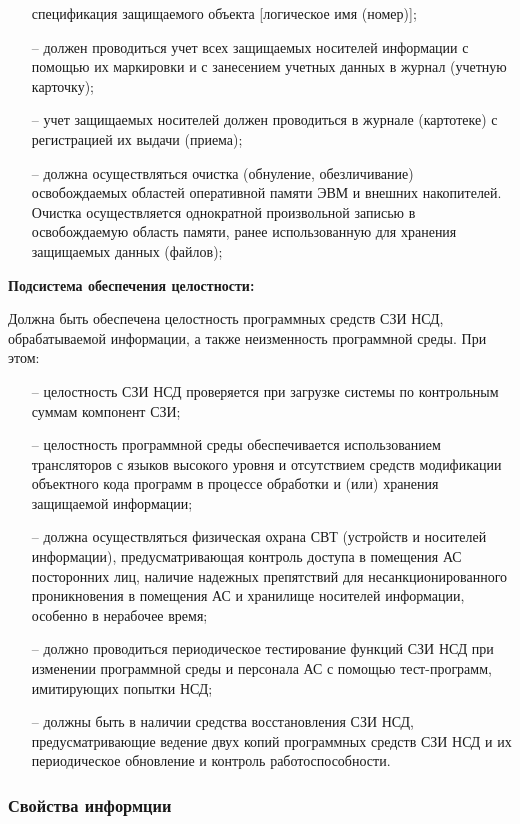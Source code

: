 \begin{itemize}
  спецификация защищаемого объекта [логическое имя (номер)];
  \item[--] должен проводиться учет всех защищаемых носителей информации с помощью их
  маркировки и с занесением учетных данных в журнал (учетную карточку);
  \item[--] учет защищаемых носителей должен проводиться в журнале (картотеке) с регистрацией
   их выдачи (приема);
  \item[--] должна осуществляться очистка (обнуление, обезличивание) освобождаемых 
  областей оперативной памяти ЭВМ и внешних накопителей. Очистка осуществляется однократной 
  произвольной записью в освобождаемую область памяти, ранее использованную для хранения 
  защищаемых данных (файлов);
\end{itemize}

\textbf{Подсистема обеспечения целостности:}

Должна быть обеспечена целостность программных средств СЗИ НСД,
обрабатываемой информации, а также неизменность программной среды. При этом:

\begin{itemize}
  \item[--] целостность СЗИ НСД проверяется при загрузке системы по контрольным
  суммам компонент СЗИ;
  \item[--] целостность программной среды обеспечивается использованием
  трансляторов с языков высокого уровня и отсутствием средств модификации
  объектного кода программ в процессе обработки и (или) хранения
  защищаемой информации;
  \item[--] должна осуществляться физическая охрана СВТ (устройств и носителей
  информации), предусматривающая контроль доступа в помещения АС
  посторонних лиц, наличие надежных препятствий для несанкционированного
  проникновения в помещения АС и хранилище носителей информации,
  особенно в нерабочее время;
  \item[--] должно проводиться периодическое тестирование функций СЗИ НСД при
  изменении программной среды и персонала АС с помощью тест-программ,
  имитирующих попытки НСД;
  \item[--] должны быть в наличии средства восстановления СЗИ НСД,
  предусматривающие ведение двух копий программных средств СЗИ НСД и
  их периодическое обновление и контроль работоспособности.
\end{itemize}

\subsubsection{Свойства информции}

